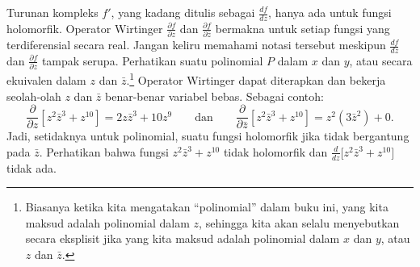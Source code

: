 \documentclass[12pt,openany]{book}
\newcommand{\myquote}[1]{``#1''}
\theoremstyle{plain}
\theoremstyle{remark}
\theoremstyle{definition}
\theoremstyle{exercise}
\theoremstyle{example}
\begin{document}
Turunan kompleks $f'$, yang kadang ditulis sebagai $\frac{df}{dz}$,
hanya ada untuk fungsi holomorfik.
Operator Wirtinger
$\frac{\partial f}{\partial z}$ dan
$\frac{\partial f}{\partial \bar{z}}$ bermakna untuk setiap fungsi yang terdiferensial secara real.
Jangan keliru memahami notasi tersebut
meskipun $\frac{df}{dz}$ dan
$\frac{\partial f}{\partial z}$ tampak serupa.
Perhatikan suatu polinomial $P$ dalam $x$ dan $y$, atau secara ekuivalen
dalam $z$ dan $\bar{z}$.\footnote{Biasanya ketika kita mengatakan \myquote{polinomial} dalam
buku ini, yang kita maksud adalah polinomial dalam $z$, sehingga kita akan selalu menyebutkan secara eksplisit
jika yang kita maksud adalah polinomial dalam $x$ dan $y$, atau $z$ dan $\bar{z}$.}
Operator Wirtinger dapat diterapkan dan
bekerja seolah-olah $z$ dan $\bar{z}$ benar-benar variabel bebas.  Sebagai contoh:
\begin{equation*}
\frac{\partial}{\partial z}
\left[ z^2 \bar{z}^3 + z^{10} \right]
=
2z \bar{z}^3 + 10 z^{9}
\qquad
\text{dan}
\qquad
\frac{\partial}{\partial \bar{z}}
\left[ z^2 \bar{z}^3 + z^{10} \right]
=
z^2 ( 3 \bar{z}^2 ) + 0 .
\end{equation*}
Jadi, setidaknya untuk polinomial, suatu fungsi holomorfik
jika tidak bergantung pada $\bar{z}$.
Perhatikan bahwa
fungsi $z^2 \bar{z}^3 + z^{10}$ tidak holomorfik
dan
$\frac{d}{dz} \bigl[ z^2 \bar{z}^3 + z^{10} \bigr]$
tidak ada.
\end{document}
